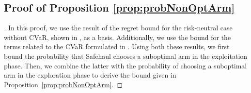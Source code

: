 \subsection*{Proof of Proposition \ref{prop:probNonOptArm}}
\begin{proof}[\unskip\nopunct]

In this proof, we use the result of the regret bound for the risk-neutral case without CVaR, shown in \cite[Theorem 3]{Auer2002}, as a basis. Additionally, we use the bound for the terms related to the CVaR formulated in \cite[Theorem 3]{Luo2017}. 
Using both these results, we first bound the probability that Safehaul chooses a suboptimal arm in the exploitation phase. Then, we combine the latter with the probability of choosing a suboptimal arm in the exploration phase to derive the bound given in Proposition~\ref{prop:probNonOptArm}.


\end{proof}
